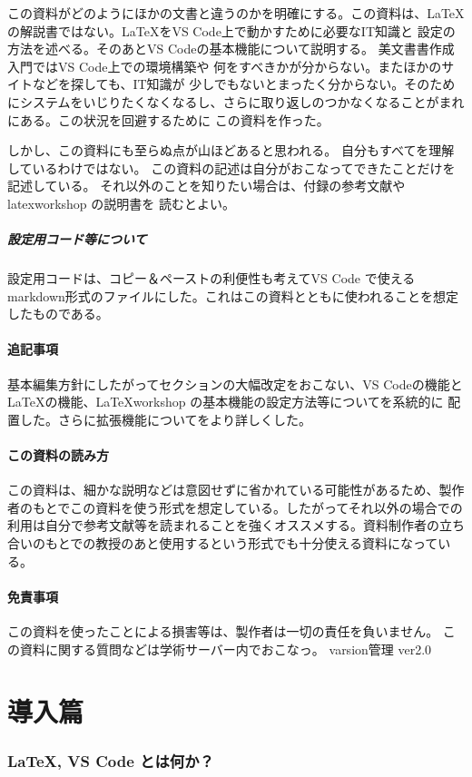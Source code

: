 \documentclass{ltjsarticle}
\begin{document}
この資料がどのようにほかの文書と違うのかを明確にする。この資料は、\LaTeX
の解説書ではない。\LaTeX をVS Code上で動かすために必要なIT知識と
設定の方法を述べる。そのあとVS Codeの基本機能について説明する。
美文書書作成入門\cite{美文書本}ではVS Code上での環境構築や
何をすべきかが分からない。またほかのサイトなどを探しても、IT知識が
少しでもないとまったく分からない。そのためにシステムをいじりたくなくなるし、さらに取り返しのつかなくなることがまれにある。この状況を回避するために
この資料を作った。

しかし、この資料にも至らぬ点が山ほどあると思われる。
自分もすべてを理解しているわけではない。
この資料の記述は自分がおこなってできたことだけを記述している。
それ以外のことを知りたい場合は、付録の参考文献やlatexworkshop の説明書を
読むとよい。
\subsubsection{設定用コード等について}
設定用コードは、コピー＆ペーストの利便性も考えてVS Code で使えるmarkdown形式のファイルにした。これはこの資料とともに使われることを想定したものである。
\subsection{追記事項}
基本編集方針にしたがってセクションの大幅改定をおこない、VS Codeの機能と
LaTeXの機能、LaTeXworkshop の基本機能の設定方法等についてを系統的に
配置した。さらに拡張機能についてをより詳しくした。
\subsection{この資料の読み方}
この資料は、細かな説明などは意図せずに省かれている可能性があるため、製作者のもとでこの資料を使う形式を想定している。したがってそれ以外の場合での利用は自分で参考文献等を読まれることを強くオススメする。資料制作者の立ち合いのもとでの教授のあと使用するという形式でも十分使える資料になっている。
\subsection{免責事項}
この資料を使ったことによる損害等は、製作者は一切の責任を負いません。
この資料に関する質問などは学術サーバー内でおこなっ。
varsion管理  ver2.0
\tableofcontents
\part{導入篇}
\section{\LaTeX, VS Code とは何か？}
\end{document}
